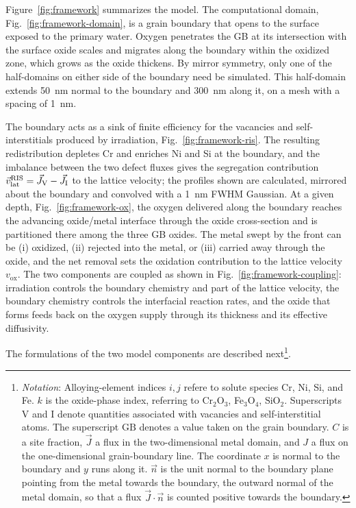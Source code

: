 \documentclass[3p,times]{elsarticle} %
\newcommand{\Vac}{\mathrm{V}}          %
\newcommand{\Int}{\mathrm{I}}          %
\newcommand{\GB}{\mathrm{GB}}
\newcommand{\lat}{\mathrm{lat}}
\newcommand{\ox}{\mathrm{ox}}
\begin{document}
Figure~\ref{fig:framework} summarizes the model. The computational domain,
Fig.~\ref{fig:framework-domain}, is a grain boundary that opens to the surface exposed to the primary water.
Oxygen penetrates the GB at its intersection with the surface oxide scales and migrates along the
boundary within the oxidized zone, which grows as the oxide thickens.
By mirror symmetry, only one of the half-domains on either side of the boundary need be simulated. This half-domain extends \SI{50}{nm} normal to the boundary and
\SI{300}{nm} along it, on a mesh with a spacing of \SI{1}{nm}.

The boundary acts as a sink of finite efficiency for the vacancies and
self-interstitials produced by irradiation, Fig.~\ref{fig:framework-ris}. The resulting
redistribution depletes Cr and enriches Ni and Si at the boundary, and the
imbalance between the two defect fluxes gives the segregation contribution
\(\vec{v}_{\lat}^{\rm RIS}=\vec{J}_{\Vac}-\vec{J}_{\Int}\) to the
lattice velocity; the profiles shown are calculated, mirrored about the boundary
and convolved with a \SI{1}{\nano\metre} FWHM Gaussian. At a given depth,
Fig.~\ref{fig:framework-ox}, the oxygen delivered along the boundary reaches the
advancing oxide/metal interface through the oxide cross-section and is
partitioned there among the three GB oxides. The metal swept by the front can be (i)
oxidized, (ii) rejected into the metal, or (iii) carried away through the oxide, and the net
removal sets the oxidation contribution to the lattice velocity \(v_{\ox}\). The two components are coupled as shown in
Fig.~\ref{fig:framework-coupling}: irradiation controls the boundary chemistry and
part of the lattice velocity, the boundary chemistry controls the interfacial
reaction rates, and the oxide that forms feeds back on the oxygen supply through
its thickness and its effective diffusivity.

The formulations of the two model components are described next\footnote{
\emph{Notation}: Alloying-element indices $i,j$ refere to solute species Cr, Ni, Si, and Fe.
$k$ is the oxide-phase index, referring to Cr$_2$O$_3$, Fe$_3$O$_4$, SiO$_2$.
Superscripts \(\Vac\) and \(\Int\) denote quantities associated with vacancies and
self-interstitial atoms. The superscript \(\GB\) denotes a value taken on the grain
boundary. \(C\) is a site fraction, \(\vec{J}\) a flux in the two-dimensional metal
domain, and \(J\) a flux on the one-dimensional grain-boundary line. The coordinate
\(x\) is normal to the boundary and \(y\) runs along it. $\vec{n}$ is the
unit normal to the boundary plane pointing from the metal towards the boundary,
the outward normal of the metal domain, so that a flux \(\vec{J}\cdot\vec{n}\)
is counted positive towards the boundary.
}.
\end{document}

